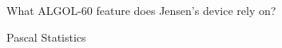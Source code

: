 \documentclass{exam} %
\begin{document}
\begin{questions}
  \question What ALGOL-60 feature does Jensen's device rely on?

  \question Pascal Statistics

\end{questions}
\end{document}
